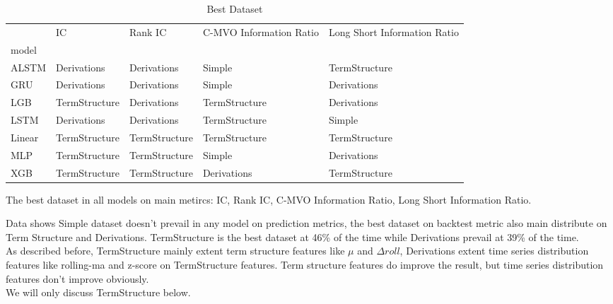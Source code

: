 \documentclass[10pt,letterpaper]{article}
\begin{document}
\begin{table}[!ht]
\begin{adjustwidth}{-2.25in}{0in} %
\centering
\caption{Best Dataset}
\label{Best Dataset}
\begin{tabular}{lllll}
\toprule
{} &             IC &        Rank IC & C-MVO Information Ratio & Long Short Information Ratio \\
model  &                &                &                         &                              \\
\midrule
ALSTM  &    Derivations &    Derivations &                  Simple &                TermStructure \\
GRU    &    Derivations &    Derivations &                  Simple &                  Derivations \\
LGB    &  TermStructure &    Derivations &           TermStructure &                  Derivations \\
LSTM   &    Derivations &    Derivations &           TermStructure &                       Simple \\
Linear &  TermStructure &  TermStructure &           TermStructure &                TermStructure \\
MLP    &  TermStructure &  TermStructure &                  Simple &                  Derivations \\
XGB    &  TermStructure &  TermStructure &             Derivations &                TermStructure \\
\bottomrule
\end{tabular}




\begin{flushleft} The best dataset in all models on main metircs: IC, Rank IC, C-MVO Information Ratio, Long Short Information Ratio.
\end{flushleft}
\label{table1}
\end{adjustwidth}

\end{table}
Data shows Simple dataset doesn't prevail in any model on prediction metrics, the best dataset on backtest metric also main distribute on Term Structure and Derivations. TermStructure is the best dataset at 46\% of the time while Derivations prevail at 39\% of the time.
\\As described before, TermStructure mainly extent term structure features like $\mu$ and $\Delta roll$, Derivations extent time series distribution features like rolling-ma and z-score on TermStructure features. Term structure features do improve the result, but time series distribution features don't improve obviously.
\\We will only discuss TermStructure below.
\end{document}
